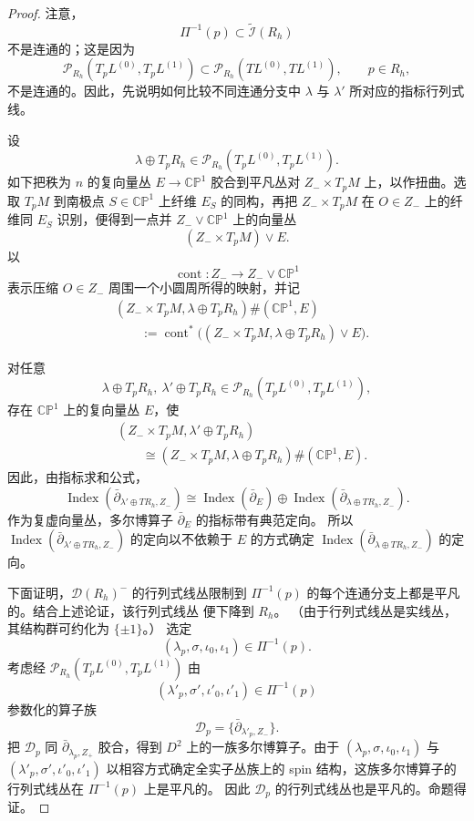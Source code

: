 \begin{proof}
注意，
\[
 \Pi^{-1}(p)\subset\widetilde{\mathcal I}(R_h)
\]
不是连通的；这是因为
\[
 \mathcal P_{R_h}(T_pL^{(0)},T_pL^{(1)})
 \subset
 \mathcal P_{R_h}(TL^{(0)},TL^{(1)}),
 \qquad p\in R_h,
\]
不是连通的。因此，先说明如何比较不同连通分支中 $\lambda$ 与
$\lambda'$ 所对应的指标行列式线。

设
\[
 \lambda\oplus T_pR_h
 \in\mathcal P_{R_h}(T_pL^{(0)},T_pL^{(1)}).
\]
如下把秩为 $n$ 的复向量丛 $E\to\mathbb{CP}^1$ 胶合到平凡丛对
$Z_-\times T_pM$ 上，以作扭曲。选取 $T_pM$ 到南极点
$S\in\mathbb{CP}^1$ 上纤维 $E_S$ 的同构，再把
$Z_-\times T_pM$ 在 $O\in Z_-$ 上的纤维同 $E_S$ 识别，便得到一点并
$Z_-\vee\mathbb{CP}^1$ 上的向量丛
\[
 (Z_-\times T_pM)\vee E.
\]
以
\[
 \operatorname{cont}\colon
 Z_-\longrightarrow Z_-\vee\mathbb{CP}^1
\]
表示压缩 $O\in Z_-$ 周围一个小圆周所得的映射，并记
\[
\begin{aligned}
 &(Z_-\times T_pM,\lambda\oplus T_pR_h)
 \#(\mathbb{CP}^1,E)\\
 &\qquad:=
 \operatorname{cont}^*
 \bigl((Z_-\times T_pM,\lambda\oplus T_pR_h)\vee E\bigr).
\end{aligned}
\]

对任意
\[
 \lambda\oplus T_pR_h,\ 
 \lambda'\oplus T_pR_h
 \in\mathcal P_{R_h}(T_pL^{(0)},T_pL^{(1)}),
\]
存在 $\mathbb{CP}^1$ 上的复向量丛 $E$，使
\[
\begin{aligned}
 &(Z_-\times T_pM,\lambda'\oplus T_pR_h)\\
 &\qquad\cong
 (Z_-\times T_pM,\lambda\oplus T_pR_h)
 \#(\mathbb{CP}^1,E).
\end{aligned}
\]
因此，由指标求和公式，
\[
 \operatorname{Index}
 (\bar\partial_{\lambda'\oplus TR_h,Z_-})
 \cong
 \operatorname{Index}(\bar\partial_E)
 \oplus
 \operatorname{Index}
 (\bar\partial_{\lambda\oplus TR_h,Z_-}).
\]
作为复虚向量丛，多尔博算子 $\bar\partial_E$ 的指标带有典范定向。
所以
$\operatorname{Index}
 (\bar\partial_{\lambda'\oplus TR_h,Z_-})$
的定向以不依赖于 $E$ 的方式确定
$\operatorname{Index}
 (\bar\partial_{\lambda\oplus TR_h,Z_-})$
的定向。

下面证明，$\mathcal D(R_h)^-$ 的行列式线丛限制到
$\Pi^{-1}(p)$ 的每个连通分支上都是平凡的。结合上述论证，该行列式线丛
便下降到 $R_h$。%
（由于行列式线丛是实线丛，其结构群可约化为 $\{\pm1\}$。）
选定
\[
 (\lambda_p,\sigma,\iota_0,\iota_1)\in\Pi^{-1}(p).
\]
考虑经
$\mathcal P_{R_h}(T_pL^{(0)},T_pL^{(1)})$
由
\[
 (\lambda'_p,\sigma',\iota'_0,\iota'_1)
 \in\Pi^{-1}(p)
\]
参数化的算子族
\[
 \mathcal D_p=\{\bar\partial_{\lambda'_p,Z_-}\}.
\]
把 $\mathcal D_p$ 同 $\bar\partial_{\lambda_p,Z_+}$ 胶合，得到
$D^2$ 上的一族多尔博算子。由于
$(\lambda_p,\sigma,\iota_0,\iota_1)$ 与
$(\lambda'_p,\sigma',\iota'_0,\iota'_1)$ 以相容方式确定全实子丛族上的
spin 结构，这族多尔博算子的行列式线丛在 $\Pi^{-1}(p)$ 上是平凡的。
因此 $\mathcal D_p$ 的行列式线丛也是平凡的。命题得证。
\end{proof}

